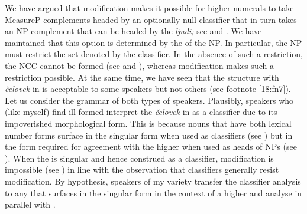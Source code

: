 \documentclass[output=paper,modfonts,newtxmath,hidelinks]{langscibook}
\begin{document}
We have argued that modification makes it possible for higher numerals to take MeasureP complements headed by an optionally null classifier that in turn takes an NP complement that can be headed by the  \textit{ljudi;} see  and . We have maintained that this option is determined by the  of the NP. In particular, the NP must restrict the set denoted by the classifier. In the absence of such a restriction, the NCC cannot be formed (see  and ), whereas modification makes such a restriction possible. At the same time, we have seen that the structure with \textit{čelovek} in  is acceptable to some speakers but not others (see footnote \ref{18:fn7}). Let us consider the grammar of both types of speakers. Plausibly, speakers who (like myself) find  ill formed interpret the  \textit{čelovek} in  as a classifier due to its impoverished morphological form. This is because nouns that have both lexical number forms surface in the  singular form when used as classifiers (see ) but in the   form required for agreement with the higher  when used as heads of NPs (see ). When the  is  singular and hence construed as a classifier, modification is impossible (see ) in line with the observation that classifiers generally resist modification. By hypothesis, speakers of my variety transfer the classifier analysis to any  that surfaces in the  singular form in the context of a higher  and analyse  in parallel with .
\ea \label{18:ex18}
	\z
\z
\largerpage[-2]
\end{document}
